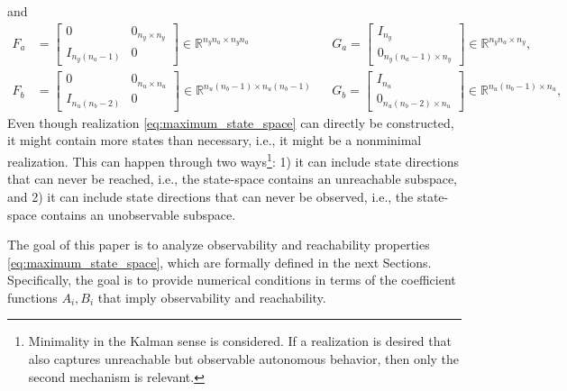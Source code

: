 and
\begin{subequations}
\label{eq:maximum_ss_FGFaGaFbGb}
\begin{align}
    F_a &= \begin{bmatrix}
        0 & 0_{n_y \times n_y} \\ %
        I_{n_y(n_a-1)} & 0
    \end{bmatrix} \in \mathbb{R}^{n_y n_a \times n_y n_a}
    &  &
    G_a = \begin{bmatrix}
        I_{n_y} \\ 0_{ n_y (n_a -1) \times n_y}
    \end{bmatrix}
    \in \mathbb{R}^{n_y n_a \times n_y}, 
    \label{eq:maximum_ss_Fa_Ga}
    \\
    F_b &= \begin{bmatrix}
        0 & 0_{n_u \times n_u} \\ %
        I_{n_u(n_b-2)} & 0
    \end{bmatrix} \in \mathbb{R}^{n_u(n_b-1) \times n_u(n_b -1)}
    & &
    G_b = \begin{bmatrix}
        I_{n_u} \\ 0_{n_u(n_b-2) \times n_u}
    \end{bmatrix}
    \in \mathbb{R}^{n_u(n_b-1) \times n_u},
    \label{eq:maximum_ss_Fb_Gb}
\end{align}
\end{subequations}
Even though realization \eqref{eq:maximum_state_space} can directly be constructed, it might contain more states than necessary, i.e., it might be a nonminimal realization. This can happen through two ways\footnote{Minimality in the Kalman sense is considered. If a realization is desired that also captures unreachable but observable autonomous behavior, then only the second mechanism is relevant.}: 1) it can include state directions that can never be reached, i.e., the state-space contains an unreachable subspace, and 2) it can include state directions that can never be observed, i.e., the state-space contains an unobservable subspace. 

The goal of this paper is to analyze observability and reachability properties \eqref{eq:maximum_state_space}, which are formally defined in the next Sections. Specifically, the goal is to provide numerical conditions in terms of the coefficient functions $A_i,B_i$ that imply observability and reachability.

